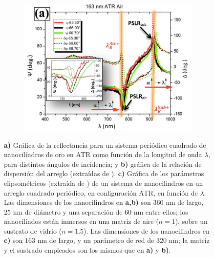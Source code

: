 \begin{figure}[h!]
		\begin{subfigure}{.01\linewidth}\caption{ }\label{sfig:PsiDelta}\vspace{3.5cm}\end{subfigure}  
		\begin{subfigure}{.33\linewidth}\includegraphics[scale=.7]{0-4-Introduccion/figs/0-ATRSingleDanilov2018}\end{subfigure}
		\caption{\textbf{a)} Gráfica de la reflectancia  para un sistema periódico cuadrado de nanocilíndros de oro en ATR como función de la longitud de onda $\lambda$, para distintos ángulos de incidencia; y \textbf{b)} gráfica de la relación de dispersión  del arreglo  (extraídas de \cite{kabashin2009plasmonic}).  \textbf{c)} Gráfica de los parámetros elipsométricos (extraída de \cite{danilov2018ultra}) de un sistema de nanocilindros en un arreglo cuadrado periódico, en configuración ATR, en función de $\lambda$.  Las dimensiones de los nanocilindros en \textbf{a,b)} son $360$ nm de largo, $25$ nm de diámetro y una separación de $60$ nm entre ellos; los nanocilíndos están inmersos en una matriz de aire ($n=1$), sobre un sustrato de vidrio ($n=1. 5$).  Las dimensiones de los nanocilindros en \textbf{c)} son $163$ nm de largo, y un parámetro de red de $320$ nm; la matriz y el sustrado empleados son los mismos que en \textbf{a)} y \textbf{b)}. }\label{fig:GraphsPapers}
	\end{figure}
	
